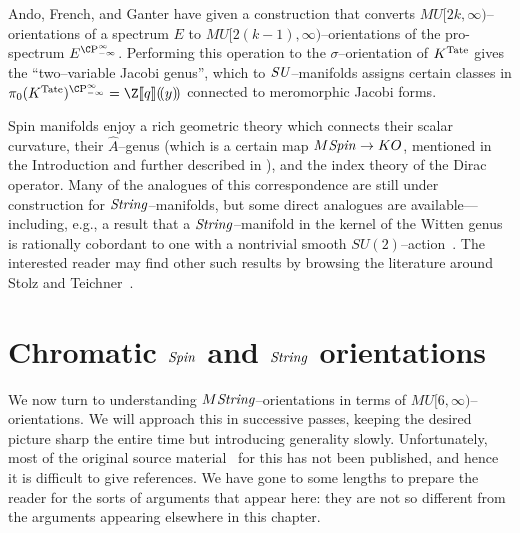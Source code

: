 \begin{remark}
Ando, French, and Ganter have given a construction that converts \(MU[2k, \infty)\)--orientations of a spectrum \(E\) to \(MU[2(k-1), \infty)\)--orientations of the pro-spectrum \(E^{\CP^\infty_{-\infty}}\).  Performing this operation to the \(\sigma\)--orientation of \(K^{\mathrm{Tate}}\) gives the ``two--variable Jacobi genus'', which to \(\mathit{SU}\)--manifolds assigns certain classes in \(\pi_0 (K^{\Tate})^{\CP^\infty_{-\infty}} = \Z\ps{q}(\!(y)\!)\) connected to meromorphic Jacobi forms.
\end{remark}

\begin{remark}
Spin manifolds enjoy a rich geometric theory which connects their scalar curvature, their $\widehat A$--genus (which is a certain map $M\mathit{Spin} \to KO$, mentioned in the Introduction and further described in ), and the index theory of the Dirac operator.  Many of the analogues of this correspondence are still under construction for $\mathit{String}$--manifolds, but some direct analogues are available---including, e.g., a result that a $\mathit{String}$--manifold in the kernel of the Witten genus is rationally cobordant to one with a nontrivial smooth $SU(2)$--action~\cite[Theorem 2.8]{Dessai}.  The interested reader may find other such results by browsing the literature around Stolz and Teichner~\cite{StolzTeichnerWhatIs}.
\end{remark}













\section{Chromatic \texorpdfstring{\(\mathit{Spin}\)}{Spin} and \texorpdfstring{\(\mathit{String}\)}{String} orientations}

We now turn to understanding \(M\mathit{String}\)--orientations in terms of \(MU[6, \infty)\)--orientations.  We will approach this in successive passes, keeping the desired picture sharp the entire time but introducing generality slowly.  Unfortunately, most of the original source material~\cite{HAS,StricklandFSKS} for this has not been published, and hence it is difficult to give references.  We have gone to some lengths to prepare the reader for the sorts of arguments that appear here: they are not so different from the arguments appearing elsewhere in this chapter.


